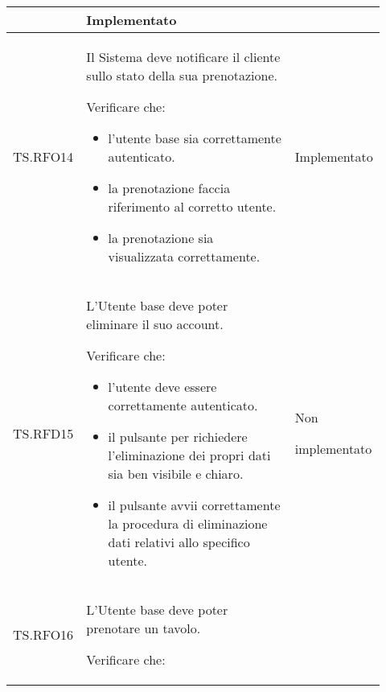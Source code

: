 \begin{longtable}{|p{0.10\linewidth}|p{0.70\linewidth}|p{0.12\linewidth}|}
\begin{itemize}
	\end{itemize}                                               &
	Implementato                                                                                                                                                            \\
	\hline
	TS.RFO14                                                                                                                        &
	Il Sistema deve notificare il cliente sullo stato della sua prenotazione.  \par
	Verificare che:
	\begin{itemize}
		\item l'utente base sia correttamente autenticato.
		\item la prenotazione faccia riferimento al corretto utente.
		\item la prenotazione sia visualizzata correttamente.
	\end{itemize}                                                                    &
	Implementato                                                                                                                                                            \\
	\hline
	TS.RFD15                                                                                                                        &
	L'Utente base deve poter eliminare il suo account. \par
	Verificare che:
	\begin{itemize}
		\item l'utente deve essere correttamente autenticato.
		\item il pulsante per richiedere l'eliminazione dei propri dati sia ben visibile e chiaro.
		\item il pulsante avvii correttamente la procedura di eliminazione dati relativi allo specifico utente.
	\end{itemize}                         &
	Non \par implementato                                                                                                                                                   \\
	\hline
	TS.RFO16                                                                                                                        &
	L'Utente base deve poter prenotare un tavolo.  \par
	Verificare che:
	\begin{itemize}

\end{itemize}
\end{longtable}
